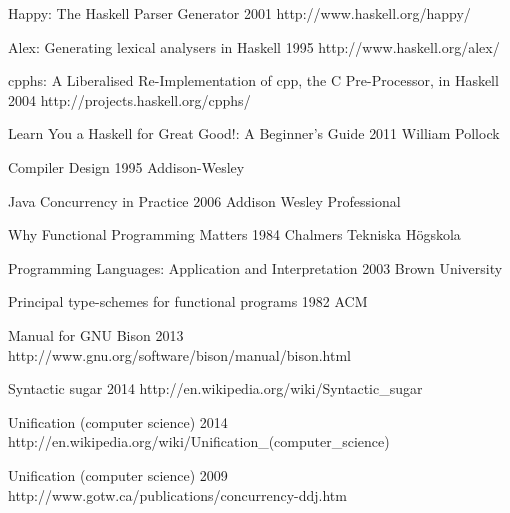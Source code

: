 
\begingroup
\renewcommand{\section}[2]{}%

\begin{thebibliography}{99}

  {Happy: The Haskell Parser Generator}
  {2001}
  {http://www.haskell.org/happy/}

  {Alex: Generating lexical analysers in Haskell}
  {1995}
  {http://www.haskell.org/alex/}

  {cpphs: A Liberalised Re-Implementation of cpp, the C Pre-Processor, in Haskell}
  {2004}
  {http://projects.haskell.org/cpphs/}

  {Learn You a Haskell for Great Good!: A Beginner's Guide}
  {2011}
  {William Pollock}

  {Compiler Design}
  {1995}
  {Addison-Wesley}

  {Java Concurrency in Practice}
  {2006}
  {Addison Wesley Professional}

  {Why Functional Programming Matters}
  {1984}
  {Chalmers Tekniska Högskola}

  {Programming Languages: Application and Interpretation}
  {2003}
  {Brown University}

  {Principal type-schemes for functional programs}
  {1982}
  {ACM}

  {Manual for GNU Bison }
  {2013}
  {http://www.gnu.org/software/bison/manual/bison.html}

  {Syntactic sugar}
  {2014}
  {http://en.wikipedia.org/wiki/Syntactic_sugar}

  {Unification (computer science)}
  {2014}
  {http://en.wikipedia.org/wiki/Unification_(computer_science)}

  {Unification (computer science)}
  {2009}
  {http://www.gotw.ca/publications/concurrency-ddj.htm}

\end{thebibliography}

\endgroup
